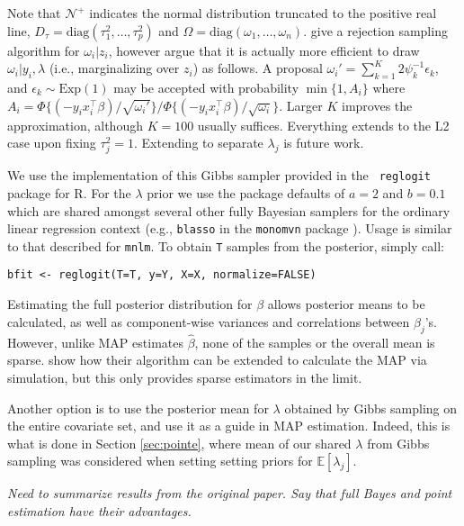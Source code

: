 Note that $\mathcal{N}^+$ indicates the normal distribution truncated
to the positive real line, $D_\tau = \mathrm{diag}(\tau_1^2, \dots,
\tau_p^2)$ and $\Omega = \mathrm{diag}(\omega_1, \dots, \omega_n)$.
\cite{holmes:held:2006} give a rejection sampling algorithm for
$\omega_i|z_i$, however \cite{gra:pols:2012} argue that it is
actually more efficient to draw $\omega_i | y_i, \lambda$ (i.e.,
marginalizing over $z_i$) as follows.  A proposal $\omega_i' =
\sum_{k=1}^K 2 \psi_k^{-1} \epsilon_k$, and $ \epsilon_k \sim
\mathrm{Exp} (1)$ may be accepted with probability $\min\{1,A_i\}$
where $A_i = \Phi\{(- y_i x_i^\top \beta)/\sqrt{\omega_i'}\}/\Phi\{(-
y_i x_i^\top \beta)/\sqrt{\omega_i}\}$. Larger $K$ improves the
approximation, although $K=100$ usually suffices.  Everything extends
to the L2 case upon fixing $\tau_j^2 = 1$.  Extending to separate
$\lambda_j$ is future work.

We use the implementation of this Gibbs sampler provided in the {\tt
  reglogit} package \cite{reglogit} for {\sf R}.  For the $\lambda$
prior we use the package defaults of $a=2$ and $b=0.1$ which are
shared amongst several other fully Bayesian samplers for the ordinary
linear regression context (e.g., {\tt blasso} in the {\tt monomvn}
package \cite{monomvn}).  
Usage is similar to that described for {\tt mnlm}.  To obtain {\tt T}
samples from the posterior, simply call:
\begin{verbatim}
bfit <- reglogit(T=T, y=Y, X=X, normalize=FALSE)
\end{verbatim}
Estimating the full posterior distribution for $\beta$ allows
posterior means to be calculated, as well as component-wise variances
and correlations between $\beta_j$'s.  However, unlike MAP estimates
$\hat{\beta}$, none of the samples or the overall mean is sparse.
\cite{gra:pols:2012} show how their algorithm can be extended to
calculate the MAP via simulation, but this only provides sparse
estimators in the limit.

Another option is to use the posterior mean for $\lambda$ obtained by
Gibbs sampling on the entire covariate set, and use it as a guide in
MAP estimation.  Indeed, this is what is done in Section
\ref{sec:pointe}, where mean of our shared $\lambda$ from Gibbs
sampling was considered when setting setting priors for
$\mathbb{E}[\lambda_j]$.



{\em Need to summarize results from the original paper.  Say that full Bayes
and point estimation have their advantages.}

